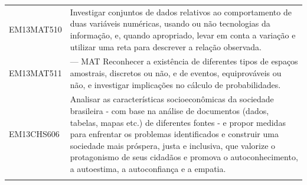 \documentclass[12pt]{extarticle}
\begin{document}
\begin{longtable}{ll}
EM13MAT510 & Investigar conjuntos de dados relativos ao comportamento de duas variáveis numéricas, usando ou não tecnologias da informação, e, quando apropriado, levar em conta a variação e utilizar uma reta para descrever a relação observada.                                                                                                                                                                                                                                                                                                                                                                                                                                                                                                                                                                                \\
\rowcolor[HTML]{FFF} 
EM13MAT511 & --- MAT Reconhecer a existência de diferentes tipos de espaços amostrais, discretos ou não, e de eventos, equiprováveis ou não, e investigar implicações no cálculo de probabilidades.                                                                                                                                                                                                                                                                                                                                                                                                                                                                                                                                                                                                                                \\
\rowcolor[HTML]{E0F7FA} 
EM13CHS606 & Analisar as características socioeconômicas da sociedade brasileira - com base na análise de documentos (dados, tabelas, mapas etc.) de diferentes fontes - e propor medidas para enfrentar os problemas identificados e construir uma sociedade mais próspera, justa e inclusiva, que valorize o protagonismo de seus cidadãos e promova o autoconhecimento, a autoestima, a autoconfiança e a empatia.                                                                                                                                                                                                                                                                                                                                                                                                              \\
\rowcolor[HTML]{FFF} 

\end{longtable}
\end{document}
